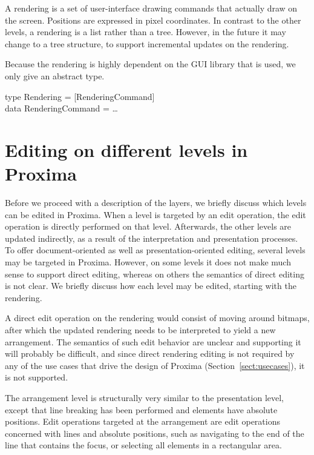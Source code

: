 \documentclass{speauth}
\begin{document}
A rendering is a set of user-interface drawing commands that actually draw on the screen. Positions are expressed in pixel coordinates. In contrast to the other levels, a rendering is a list rather than a tree. However, in the future it may change to a tree structure, to support incremental updates on the rendering. 

Because the rendering is highly dependent on the GUI library that is used, we only give an abstract type.

\noindent
\ttfamily
\begin{tabbing}
type Rendering = [RenderingCommand]\\
data RenderingCommand = \dots
\end{tabbing}
\rmfamily




%																
%																
%																
\section{Editing on different levels in Proxima}

Before we proceed with a description of the layers, we briefly discuss which levels can be edited in Proxima. When a level is targeted by an edit operation, the edit operation is directly performed on that level. Afterwards, the other levels are updated indirectly, as a result of the interpretation and presentation processes. To offer document-oriented as well as presentation-oriented editing, several levels may be targeted in Proxima. However, on some levels it does not make much sense to support direct editing, whereas on others the semantics of direct editing is not clear. We briefly discuss how each level may be edited, starting with the rendering.


A direct edit operation on the rendering would consist of moving around bitmaps, after which the updated rendering needs to be interpreted to yield a new arrangement. The semantics of such edit behavior are unclear and supporting it will probably be difficult, and since direct rendering editing is not required by any of the use cases that drive the design of Proxima (Section~\ref{sect:usecases}), it is not supported.
  
  
\bc
The arrangement level is structurally very similar to the presentation level, except that line breaking has been performed and elements have absolute positions. Edit operations targeted at the arrangement are edit operations concerned with lines and absolute positions, such as navigating to the end of the line that contains the focus, or selecting all elements in a rectangular area.
\ec
{}
\end{document}

